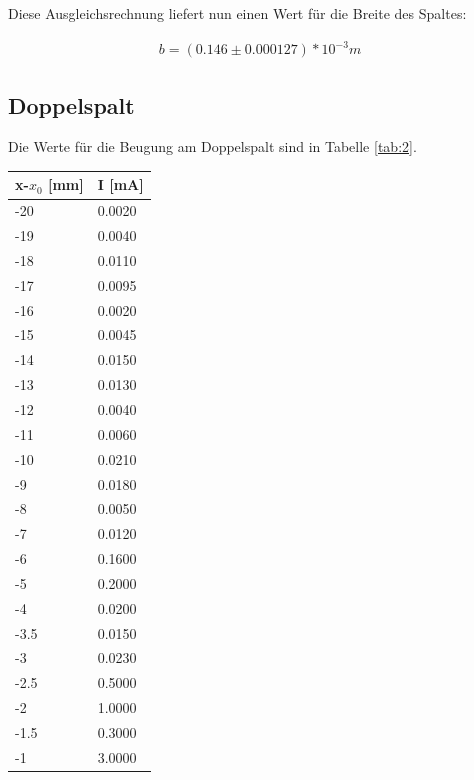 Diese Ausgleichsrechnung liefert nun einen Wert für die Breite des Spaltes:

\begin{align*}
    b = (0.146\pm 0.000127)*10^{-3}m
\end{align*}

\subsection{Doppelspalt}

Die Werte für die Beugung am Doppelspalt sind in Tabelle \ref{tab:2}.

\begin{minipage}{\linewidth}
    \begin{table}[H]
        \centering
    \begin{tabular}{ll}
        \toprule
        x-$x_0$ [mm] & I [mA] \\
        \midrule
        -20  &   0.0020 \\ 
        -19  &   0.0040 \\ 
        -18  &   0.0110  \\ 
        -17  &   0.0095  \\ 
        -16  &   0.0020   \\ 
        -15  &   0.0045  \\ 
        -14  &   0.0150 \\ 
        -13  &   0.0130  \\ 
        -12  &   0.0040  \\ 
        -11  &   0.0060 \\ 
        -10  &   0.0210 \\ 
        -9   &   0.0180  \\ 
        -8   &   0.0050 \\ 
        -7   &   0.0120 \\ 
        -6   &   0.1600  \\ 
        -5   &   0.2000 \\ 
        -4   &   0.0200 \\ 
        -3.5 &   0.0150   \\ 
        -3   &   0.0230   \\ 
        -2.5 &   0.5000   \\ 
        -2   &   1.0000    \\ 
        -1.5 &   0.3000   \\ 
        -1   &   3.0000   \\ 

\end{tabular}
\end{table}
\end{minipage}
